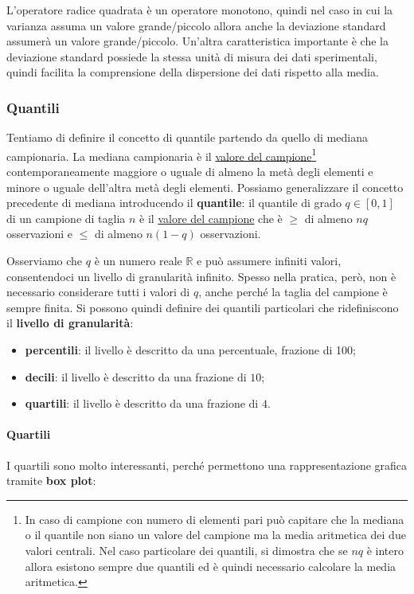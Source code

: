 \noindent L'operatore radice quadrata è un operatore monotono, quindi nel caso in cui la varianza assuma un valore grande/piccolo allora anche la deviazione standard assumerà un valore grande/piccolo.
Un'altra caratteristica importante è che la deviazione standard possiede la stessa unità di misura dei dati sperimentali, quindi facilita la comprensione della dispersione dei dati rispetto alla media.

\subsubsection{Quantili}
Tentiamo di definire il concetto di quantile partendo da quello di mediana campionaria. La mediana campionaria è il \underline{valore del campione}\footnote{
In caso di campione con numero di elementi pari può capitare che la mediana o il quantile non siano un valore del campione ma la media aritmetica dei due valori centrali. Nel caso particolare dei quantili, si dimostra che se $nq$ è intero allora esistono sempre due quantili ed è quindi necessario calcolare la media aritmetica.
} contemporaneamente maggiore o uguale di almeno la metà degli elementi e minore o uguale dell'altra metà degli elementi.
Possiamo generalizzare il concetto precedente di mediana introducendo il \textbf{quantile}: il quantile di grado $q \in [0,1]$ di un campione di taglia $n$ è il \underline{valore del campione} che è $\ge$ di almeno $nq$ osservazioni e $\le$ di almeno $n(1-q)$ osservazioni.

\noindent Osserviamo che $q$ è un numero reale $\mathbb R$ e può assumere infiniti valori, consentendoci un livello di granularità infinito. Spesso nella pratica, però, non è necessario considerare tutti i valori di $q$, anche perché la taglia del campione è sempre finita. Si possono quindi definire dei quantili particolari che ridefiniscono il \textbf{livello di granularità}:
\begin{itemize}
    \item \textbf{percentili}: il livello è descritto da una percentuale, frazione di 100;
    \item \textbf{decili}: il livello è descritto da una frazione di $10$;
    \item \textbf{quartili}: il livello è descritto da una frazione di $4$.
\end{itemize}

\paragraph{Quartili}
I quartili sono molto interessanti, perché permettono una rappresentazione grafica tramite \textbf{box plot}:

